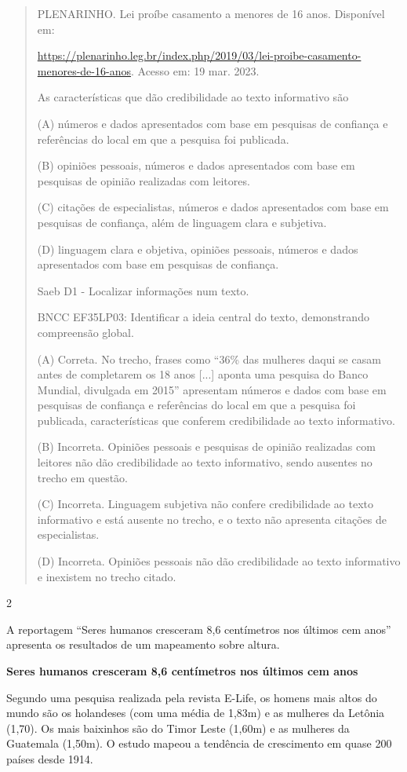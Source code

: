 \begin{itemize}
{{{\begin{itemize}
\begin{itemize}
\begin{itemize}
\begin{quote}
PLENARINHO. Lei proíbe casamento a menores de 16 anos. Disponível em:

\url{https://plenarinho.leg.br/index.php/2019/03/lei-proibe-casamento-menores-de-16-anos}.
Acesso em: 19 mar. 2023.

As características que dão credibilidade ao texto informativo são

(A) números e dados apresentados com base em pesquisas de confiança e
referências do local em que a pesquisa foi publicada.

(B) opiniões pessoais, números e dados apresentados com base em
pesquisas de opinião realizadas com leitores.

(C) citações de especialistas, números e dados apresentados com base em
pesquisas de confiança, além de linguagem clara e subjetiva.

(D) linguagem clara e objetiva, opiniões pessoais, números e dados
apresentados com base em pesquisas de confiança.

Saeb D1 - Localizar informações num texto.

BNCC EF35LP03: Identificar a ideia central do texto, demonstrando
compreensão global.

(A) Correta. No trecho, frases como ``36\% das mulheres daqui se casam
antes de completarem os 18 anos {[}...{]} aponta uma pesquisa do Banco
Mundial, divulgada em 2015'' apresentam números e dados com base em
pesquisas de confiança e referências do local em que a pesquisa foi
publicada, características que conferem credibilidade ao texto
informativo.

(B) Incorreta. Opiniões pessoais e pesquisas de opinião realizadas com
leitores não dão credibilidade ao texto informativo, sendo ausentes no
trecho em questão.

(C) Incorreta. Linguagem subjetiva não confere credibilidade ao texto
informativo e está ausente no trecho, e o texto não apresenta citações
de especialistas.

(D) Incorreta. Opiniões pessoais não dão credibilidade ao texto
informativo e inexistem no trecho citado.
\end{quote}

\num{2}

A reportagem ``Seres humanos cresceram 8,6 centímetros nos últimos cem
anos'' apresenta os resultados de um mapeamento sobre altura.

\textbf{Seres humanos cresceram 8,6 centímetros nos últimos cem anos}

Segundo uma pesquisa realizada pela revista E-Life, os homens mais altos
do mundo são os holandeses (com uma média de 1,83m) e as mulheres da
Letônia (1,70). Os mais baixinhos são do Timor Leste (1,60m) e as
mulheres da Guatemala (1,50m). O estudo mapeou a tendência de
crescimento em quase 200 países desde 1914.


\end{itemize}
\end{itemize}
\end{itemize}}}}
\end{itemize}
